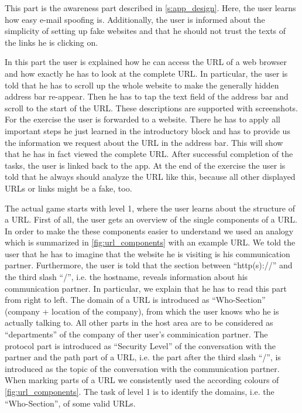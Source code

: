 \begin{description}[leftmargin=0cm]
	\item[Introduction Part 1:] This part is the awareness part described in \autoref{s:app_design}. Here, the user learns how easy e-mail spoofing is.
 Additionally, the user is informed about the simplicity of setting up fake websites and that he should not trust the texts of the links he is clicking on.

	\item[Introduction Part 2:] In this part the user is explained how he can access the URL of a web browser and how exactly he has to look at the complete URL.
 In particular, the user is told that he has to scroll up the whole website to make the generally hidden address bar re-appear.
 Then he has to tap the text field of the address bar and scroll to the start of the URL.
These descriptions are supported with screenshots.
For the exercise the user is forwarded to a website.
There he has to apply all important steps he just learned in the introductory block and has to provide us the information we request about the URL in the address bar.
 This will show that he has in fact viewed the complete URL.
After successful completion of the tasks, the user is linked back to the app.
 At the end of the exercise the user is told that he always should analyze the URL like this, because all other displayed URLs or links might be a fake, too.

	\item[Level 1:] The actual game starts with level 1, where the user learns about the structure of a URL.
 First of all, the user gets an overview of the single components of a URL.
 In order to make the these components easier to understand we used an analogy which is summarized in \autoref{fig:url_components} with an example URL.
 We told the user that he has to imagine that the website he is visiting is his communication partner.
 Furthermore, the user is told that the section between ``http(s)://'' and the third slash ``/'', i.e. the hostname, reveals information about his communication partner.
 In particular, we explain that he has to read this part from right to left.
 The domain of a URL is introduced as ``Who-Section'' (company + location of the company), from which the user knows who he is actually talking to.
 All other parts in the host area are to be considered as ``departments'' of the company of ther user's comminication partner.
 The protocol part is introduced as ``Security Level'' of the conversation with the partner and the path part of a URL, i.e. the part after the third slash ``/'', is introduced as the topic of the conversation with the communication partner.
 When marking parts of a URL we consistently used the according colours of \autoref{fig:url_components}. 
The task of level 1 is to identify the domains, i.e. the ``Who-Section'', of some valid URLs.


\end{description}
